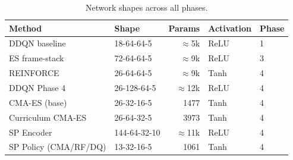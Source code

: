 \documentclass[11pt, oneside]{article}
\begin{document}
\begin{table}[H]\centering\small
\caption{Network shapes across all phases.}
\begin{tabular}{llrll}
\toprule
Method & Shape & Params & Activation & Phase \\
\midrule
DDQN baseline & 18-64-64-5 & $\approx$5k & ReLU & 1 \\
ES frame-stack & 72-64-64-5 & $\approx$9k & ReLU & 3 \\
REINFORCE & 26-64-64-5 & $\approx$9k & Tanh & 4 \\
DDQN Phase 4 & 26-128-64-5 & $\approx$12k & ReLU & 4 \\
CMA-ES (base) & 26-32-16-5 & 1477 & Tanh & 4 \\
Curriculum CMA-ES & 26-64-32-5 & 3973 & Tanh & 4 \\
SP Encoder & 144-64-32-10 & $\approx$11k & ReLU & 4 \\
SP Policy (CMA/RF/DQ) & 13-32-16-5 & 1061 & Tanh & 4 \\
\bottomrule
\end{tabular}
\end{table}
\end{document}
